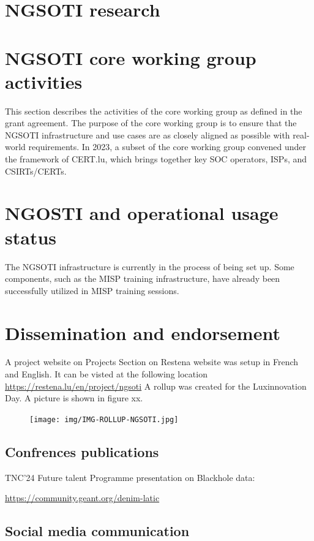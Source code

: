 \chapter{NGSOTI research}

\chapter{NGSOTI core working group activities}
This section describes the activities of the core working group as defined in the grant agreement. The purpose of the core working group is to ensure that the NGSOTI infrastructure and use cases are as closely aligned as possible with real-world requirements. In 2023, a subset of the core working group convened under the framework of CERT.lu, which brings together key SOC operators, ISPs, and CSIRTs/CERTs.

\chapter{NGOSTI and operational usage status}

The NGSOTI infrastructure is currently in the process of being set up. Some components, such as the MISP training infrastructure, have already been successfully utilized in MISP training sessions.

\chapter{Dissemination and endorsement}

A project website on Projects Section on Restena website was setup in French and English.
It can be visted at the following location \url{  https://restena.lu/en/project/ngsoti}
A rollup was created for the Luxinnovation Day. A picture is shown in figure xx.

\begin{figure}
    \texttt{[image: img/IMG-ROLLUP-NGSOTI.jpg]}
\end{figure}

\section{Confrences publications}

TNC'24 Future talent Programme presentation on Blackhole data:

  \url{https://community.geant.org/denim-latic}



\section{ Social media communication}


